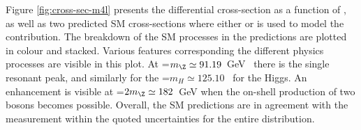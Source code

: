 Figure \ref{fig:cross-sec-m4l} presents the differential cross-section as a function of \mFourL{}, as well as two predicted SM cross-sections
where either \SHERPA{} or \POWHEG{} is used to model the \qqFourL{} contribution. The breakdown of the SM processes in the predictions are plotted in colour and stacked. Various features corresponding the different physics processes are visible in this plot. At \mFourL{}=$m_\Z\simeq 91.19$~GeV~\cite{pdg_2021} there is the single resonant \Z peak, and similarly for the \mFourL{}=$m_{H}\simeq125.10$~\cite{pdg_2021} for the Higgs. An enhancement is visible at \mFourL{}=$2m_\Z\simeq 182$~GeV when the on-shell production of two \Z bosons becomes possible. Overall, the SM predictions are in agreement with the measurement within the quoted uncertainties for the entire distribution.

